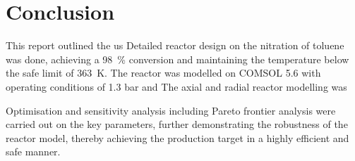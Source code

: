 \section{Conclusion} \label{sec:conclusion}
This report outlined the us
Detailed reactor design on the nitration of toluene was done, achieving a \SI{98}{\%} conversion and maintaining the temperature below the safe limit of \SI{363}{\K}. The reactor was modelled on COMSOL 5.6 with operating conditions of 1.3 bar and 
The axial and radial reactor modelling was 

Optimisation and sensitivity analysis including Pareto frontier analysis were carried out on the key parameters, further demonstrating the robustness of the reactor model, thereby achieving the production target in a highly efficient and safe manner.  